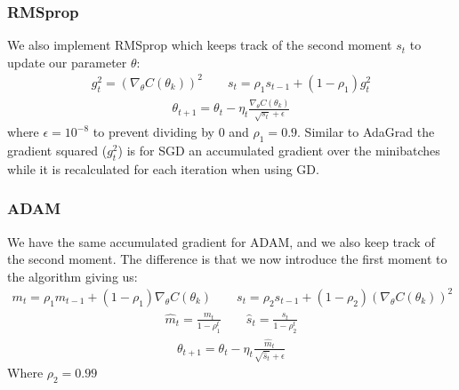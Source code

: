 \documentclass[11pt]{article}
\begin{document}
\subsubsection*{RMSprop}
We also implement RMSprop which keeps track of the second moment $s_t$ to update our parameter $\theta$:
\begin{align*}
  g_t^2 = (\nabla_\theta C(\theta_k))^2  \quad\quad s_t = \rho_1 s_{t-1} + (1- \rho_1)g_t^2
\end{align*}
\begin{align*}
  \theta_{t+1} = \theta_t - \eta_t \frac{\nabla_\theta C(\theta_k)}{\sqrt{s_t} + \epsilon }
\end{align*}
where $\epsilon=10^{-8}$ to prevent dividing by 0 and $\rho_1 = 0.9$. Similar to AdaGrad the gradient squared ($g_t^2$) is for SGD an accumulated gradient over the minibatches while it is recalculated for each iteration when using GD.
\subsubsection*{ADAM}
We have the same accumulated gradient for ADAM, and we also keep track of the second moment. The difference is that we now introduce the first moment to the algorithm giving us:
\begin{align*}
  m_t = \rho_1 m_{t-1} + (1-\rho_1)\nabla_\theta C(\theta_k) \quad\quad s_t = \rho_2 s_{t-1} + (1- \rho_2)(\nabla_\theta C(\theta_k))^2
\end{align*}
\begin{align*}
  \hat{m}_t = \frac{m_t }{1-\rho_1^t} \quad\quad \hat{s}_t = \frac{s_t }{1- \rho_2^t}
\end{align*}
\begin{align*}
  \theta_{t+1} = \theta_t - \eta_t \frac{\hat{m}_t}{\sqrt{\hat{s}_t} + \epsilon }
\end{align*}
Where $\rho_2=0.99$
\end{document}
